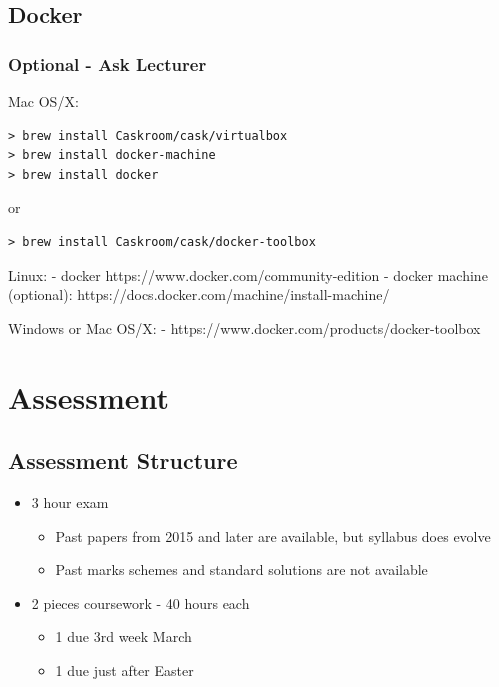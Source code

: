 \subsection{Docker}\label{docker}

\subsubsection{Optional - Ask Lecturer}\label{optional---ask-lecturer}

Mac OS/X:

\begin{verbatim}
> brew install Caskroom/cask/virtualbox
> brew install docker-machine
> brew install docker
\end{verbatim}

or

\begin{verbatim}
> brew install Caskroom/cask/docker-toolbox
\end{verbatim}

Linux: - docker https://www.docker.com/community-edition - docker
machine (optional): https://docs.docker.com/machine/install-machine/

Windows or Mac OS/X: - https://www.docker.com/products/docker-toolbox

\section{Assessment}\label{assessment}

\subsection{Assessment Structure}\label{assessment-structure}

\begin{itemize}
\itemsep1pt\parskip0pt
\item
  3 hour exam

  \begin{itemize}
  \itemsep1pt\parskip0pt
  \item
    Past papers from 2015 and later are available, but syllabus does
    evolve
  \item
    Past marks schemes and standard solutions are not available
  \end{itemize}
\item
  2 pieces coursework - 40 hours each

  \begin{itemize}
  \itemsep1pt\parskip0pt
  \item
    1 due 3rd week March
  \item
    1 due just after Easter
  \end{itemize}
\end{itemize}
